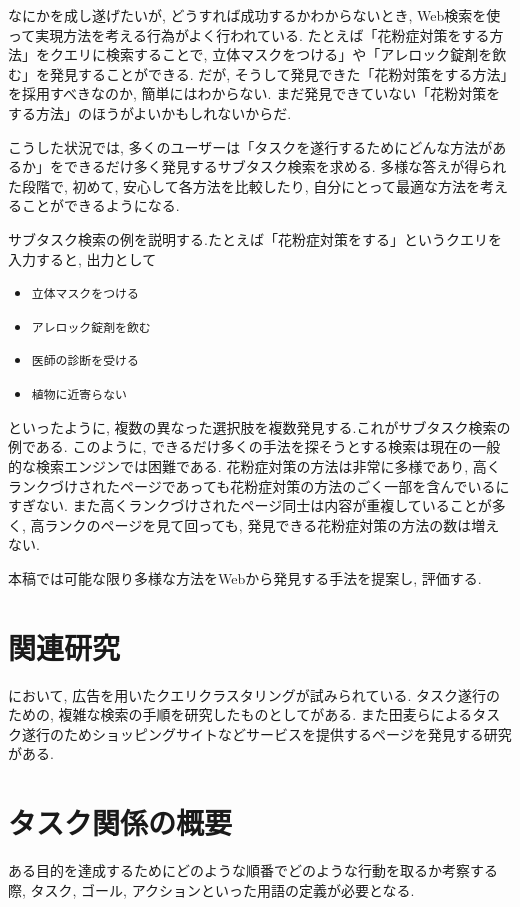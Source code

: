 \documentclass[submit,techreq]{ipsj}
\def\|{\verb|}
\begin{document}
なにかを成し遂げたいが, どうすれば成功するかわからないとき, Web検索を使って実現方法を考える行為がよく行われている. たとえば「花粉症対策をする方法」をクエリに検索することで, 立体マスクをつける」や「アレロック錠剤を飲む」を発見することができる. だが, そうして発見できた「花粉対策をする方法」を採用すべきなのか, 簡単にはわからない. まだ発見できていない「花粉対策をする方法」のほうがよいかもしれないからだ.

こうした状況では, 多くのユーザーは「タスクを遂行するためにどんな方法があるか」をできるだけ多く発見するサブタスク検索を求める. 多様な答えが得られた段階で, 初めて, 安心して各方法を比較したり, 自分にとって最適な方法を考えることができるようになる.

サブタスク検索の例を説明する.たとえば「花粉症対策をする」というクエリを入力すると, 出力として


\begin{itemize}
\item \|立体マスクをつける|
\item \|アレロック錠剤を飲む|
\item \|医師の診断を受ける|
\item \|植物に近寄らない|
\end{itemize}


といったように, 複数の異なった選択肢を複数発見する.これがサブタスク検索の例である. このように, できるだけ多くの手法を探そうとする検索は現在の一般的な検索エンジンでは困難である. 花粉症対策の方法は非常に多様であり, 高くランクづけされたページであっても花粉症対策の方法のごく一部を含んでいるにすぎない. また高くランクづけされたページ同士は内容が重複していることが多く, 高ランクのページを見て回っても, 発見できる花粉症対策の方法の数は増えない.

本稿では可能な限り多様な方法をWebから発見する手法を提案し, 評価する.


\section{関連研究}

\cite{yamatake}において, 広告を用いたクエリクラスタリングが試みられている. タスク遂行のための, 複雑な検索の手順を研究したものとして\cite{hassan}がある. また田麦らによるタスク遂行のためショッピングサイトなどサービスを提供するページを発見する研究\cite{tamugi}がある.

\section{タスク関係の概要}
ある目的を達成するためにどのような順番でどのような行動を取るか考察する際, タスク, ゴール, アクションといった用語の定義が必要となる.
\end{document}
